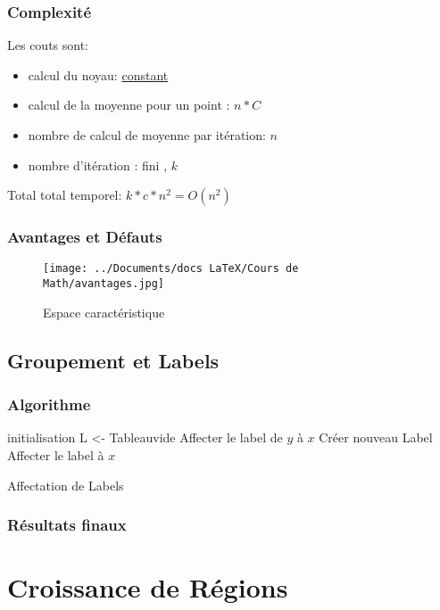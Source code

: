 \documentclass{beamer}
\begin{document}
\begin{frame}
\frametitle{Complexité}
Les couts sont:\
\begin{itemize}
\item calcul du noyau: \underline{constant}
\item calcul de la moyenne pour un point : \underline{$n*C$}
\item nombre de calcul de moyenne par itération: \underline{$n$}
\item nombre d'itération : fini , $k$
\end{itemize}
\begin{block}{Total}
total temporel: $k*c*n^2 = O(n^2)$
\end{block} 
\end{frame}

\begin{frame}
\frametitle{Avantages et Défauts}
\begin{figure}
\texttt{[image: ../Documents/docs LaTeX/Cours de Math/avantages.jpg]}
\caption{Espace caractéristique}
\end{figure}
\end{frame}

\subsection*{Groupement et Labels}

\begin{frame}
\frametitle{Algorithme}
\scriptsize
\begin{algorithm}[H]
\SetAlgoLined
{}
initialisation\;
L <- Tableauvide
	{
		{
			{
					{
					Affecter le label de $y$ à $x$
					}
					{
						{
						 Créer nouveau Label\\
						 Affecter le label à $x$
						}
						{}
					}
			}
			{}
		}
	}
\caption{Affectation de Labels}
\end{algorithm}
\end{frame}

\begin{frame}
\frametitle{Résultats finaux}
\end{frame}

\section{Croissance de Régions}
\end{document}
